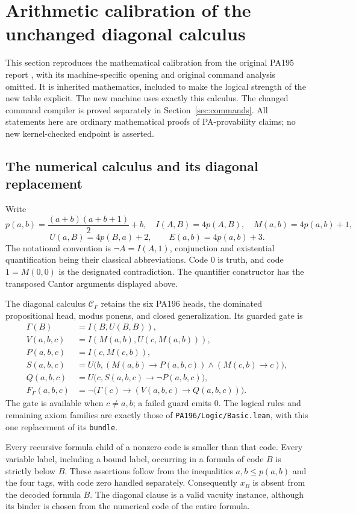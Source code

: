\section{Arithmetic calibration of the unchanged diagonal calculus}
\label{sec:pa-calibration}
This section reproduces the mathematical calibration from the original PA195
report \cite{pa195}, with its machine-specific opening and original command
analysis omitted. It is inherited mathematics, included to make the logical
strength of the new table explicit. The new machine uses exactly this
calculus. The changed command compiler is proved separately in
Section~\ref{sec:commands}. All statements here are ordinary mathematical
proofs of PA-provability claims; no new kernel-checked endpoint is asserted.

\subsection{The numerical calculus and its diagonal replacement}

Write
\[
 p(a,b)=\frac{(a+b)(a+b+1)}2+b,
 \quad I(A,B)=4p(A,B),\quad M(a,b)=4p(a,b)+1,
\]
\[
 U(a,B)=4p(B,a)+2,\qquad E(a,b)=4p(a,b)+3.
\]
The notational convention is $\neg A=I(A,1)$, conjunction and existential
quantification being their classical abbreviations. Code $0$ is truth,
and code $1=M(0,0)$ is the designated contradiction. The quantifier
constructor has the transposed Cantor arguments displayed above.

The diagonal calculus $\mathcal C_\Gamma$ retains the six PA196 heads,
the dominated propositional head, modus ponens, and closed
generalization. Its guarded gate is
\begin{align*}
 \Gamma(B)&=I(B,U(B,B)),\\
 V(a,b,c)&=I(M(a,b),U(c,M(a,b))),\\
 P(a,b,c)&=I(c,M(c,b)),\\
 S(a,b,c)&=U\bigl(b,
       (M(a,b)\to P(a,b,c))\wedge(M(c,b)\to c)\bigr),\\
 Q(a,b,c)&=U\bigl(c,S(a,b,c)\to\neg P(a,b,c)\bigr),\\
 F_\Gamma(a,b,c)&=\neg\bigl(\Gamma(c)\to(V(a,b,c)\to Q(a,b,c))\bigr).
\end{align*}
The gate is available when $c\ne a,b$; a failed guard emits $0$.
The logical rules and remaining axiom families are exactly those of
\texttt{PA196/Logic/Basic.lean}, with this one replacement of its
\texttt{bundle}.

Every recursive formula child of a nonzero code is smaller than that
code. Every variable label, including a bound label, occurring in a
formula of code $B$ is strictly below $B$. These assertions follow from
the inequalities $a,b\le p(a,b)$ and the four tags, with code zero handled
separately. Consequently $x_B$ is absent from the decoded formula $B$.
The diagonal clause is a valid vacuity instance, although its binder is
chosen from the numerical code of the entire formula.

